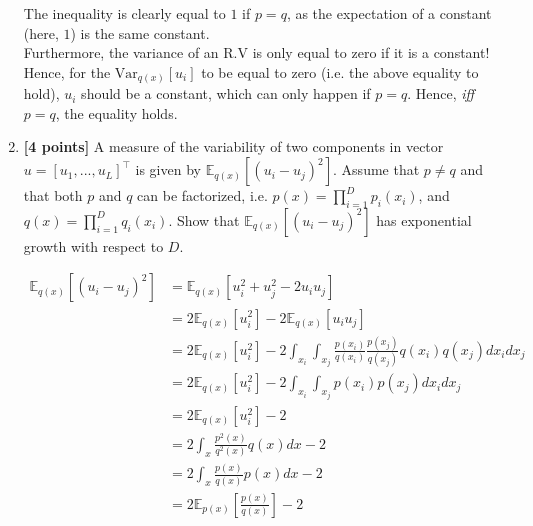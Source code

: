 \documentclass[10pt]{article}
\begin{document}
\begin{enumerate}
\begin{solution}
    The inequality is clearly equal to $1$ if $p=q$, as the expectation of a constant (here, $1$) is the same constant. \\
    Furthermore, the variance of an R.V is only equal to zero if it is a constant! Hence, for the $\textrm{Var}_{q(x)}[u_i]$ to be equal to zero (i.e. the above equality to hold), $u_i$ should be a constant, which can only happen if $p=q$.
    Hence, \emph{iff} $p=q$, the equality holds.

\end{solution}

    \item \textbf{[4 points]} A measure of the variability of two components in vector $u = [u_1,...,u_L]^\top$ is given by $\mathbb{E}_{q(x)} [(u_i-u_j)^2]$. \color{red}Assume that $p \neq q$ \color{black} and that both $p$ and $q$ can be factorized, i.e. $p(x) = \prod_{i=1}^D p_i(x_i)$, and $q(x) = \prod_{i=1}^D q_i(x_i)$. Show that $\mathbb{E}_{q(x)} [(u_i-u_j)^2]$ has exponential growth with respect to $D$.

\begin{solution}
\begin{align*}
    \mathbb{E}_{q(x)} [(u_i-u_j)^2] &= \mathbb{E}_{q(x)} [u_i^2 + u_j^2 -2u_iu_j] \\
    &= 2\mathbb{E}_{q(x)} [u_i^2] - 2\mathbb{E}_{q(x)}[u_iu_j] \\
    &= 2\mathbb{E}_{q(x)} [u_i^2] - 2 \int_{x_i} \int_{x_j}\frac{p(x_i)}{q(x_i)}\frac{p(x_j)}{q(x_j)} q(x_i) q(x_j) dx_i dx_j \\
    &= 2\mathbb{E}_{q(x)} [u_i^2] - 2 \int_{x_i} \int_{x_j}p(x_i)p(x_j) dx_i dx_j \\
    &= 2\mathbb{E}_{q(x)} [u_i^2] - 2\\
    &= 2\int_{x}\frac{p^2(x)}{q^2(x)} q(x)dx - 2\\
    &= 2\int_{x}\frac{p(x)}{q(x)} p(x)dx - 2\\
    &= 2\mathbb{E}_{p(x)}\left[\frac{p(x)}{q(x)}\right] - 2\\
\end{align*}


\end{solution}
\end{enumerate}
\end{document}
